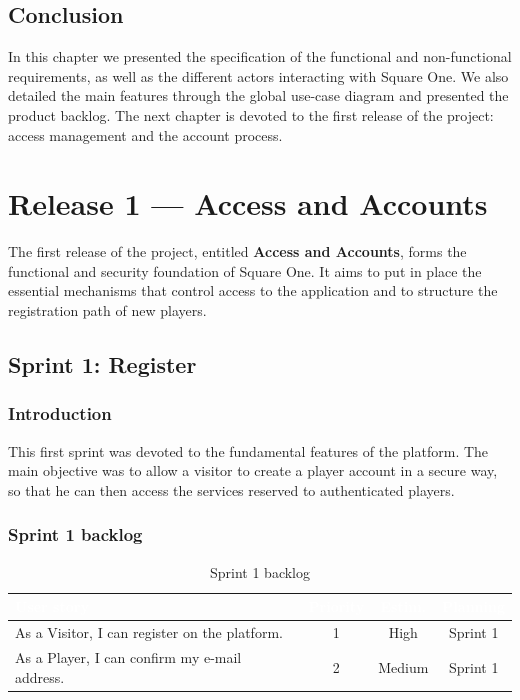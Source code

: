 \documentclass[12pt,a4paper,oneside]{report}
\begin{document}
\section{Conclusion}
In this chapter we presented the specification of the functional and non-functional requirements, as well as the different actors interacting with Square One. We also detailed the main features through the global use-case diagram and presented the product backlog. The next chapter is devoted to the first release of the project: access management and the account process.

\chapter{Release 1 --- Access and Accounts}
The first release of the project, entitled \textbf{Access and Accounts}, forms the functional and security foundation of Square One. It aims to put in place the essential mechanisms that control access to the application and to structure the registration path of new players.

\section{Sprint 1: Register}
\subsection{Introduction}
This first sprint was devoted to the fundamental features of the platform. The main objective was to allow a visitor to create a player account in a secure way, so that he can then access the services reserved to authenticated players.

\subsection{Sprint 1 backlog}
{\small
\renewcommand{\arraystretch}{1.3}
\setlength{\tabcolsep}{4pt}
\begin{table}[H]
\centering
\caption{Sprint 1 backlog}
\label{tab:sprint1-backlog}
\begin{tabularx}{\linewidth}{|>{\raggedright\arraybackslash}X|c|c|c|}
\hline
\rowcolor{sectionblue}
\textcolor{white}{\textbf{User story}} &
\textcolor{white}{\textbf{Priority}} &
\textcolor{white}{\textbf{Estim.}} &
\textcolor{white}{\textbf{Planning}} \\
\hline
As a Visitor, I can register on the platform. & 1 & High & Sprint 1 \\
\hline
As a Player, I can confirm my e-mail address. & 2 & Medium & Sprint 1 \\
\hline
\end{tabularx}
\end{table}
}
\end{document}
